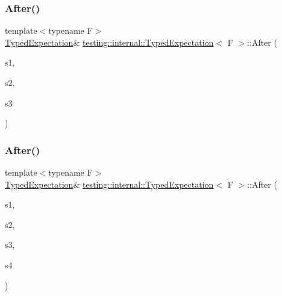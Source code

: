 \mbox{\label{classtesting_1_1internal_1_1_typed_expectation_a95a341dd221901b5e51dd7cfdbdb3570}} 
\subsubsection{\texorpdfstring{After()}{After()}\hspace{0.1cm}{\footnotesize\ttfamily [3/5]}}
{\footnotesize\ttfamily template$<$typename F$>$ \\
\hyperlink{classtesting_1_1internal_1_1_typed_expectation}{Typed\+Expectation}\& \hyperlink{classtesting_1_1internal_1_1_typed_expectation}{testing\+::internal\+::\+Typed\+Expectation}$<$ F $>$\+::After (\begin{DoxyParamCaption}\item[{const \hyperlink{classtesting_1_1_expectation_set}{Expectation\+Set} \&}]{s1,  }\item[{const \hyperlink{classtesting_1_1_expectation_set}{Expectation\+Set} \&}]{s2,  }\item[{const \hyperlink{classtesting_1_1_expectation_set}{Expectation\+Set} \&}]{s3 }\end{DoxyParamCaption})\hspace{0.3cm}{\ttfamily [inline]}}

\mbox{\label{classtesting_1_1internal_1_1_typed_expectation_a1749e368f659352ed8375512acafc178}} 
\subsubsection{\texorpdfstring{After()}{After()}\hspace{0.1cm}{\footnotesize\ttfamily [4/5]}}
{\footnotesize\ttfamily template$<$typename F$>$ \\
\hyperlink{classtesting_1_1internal_1_1_typed_expectation}{Typed\+Expectation}\& \hyperlink{classtesting_1_1internal_1_1_typed_expectation}{testing\+::internal\+::\+Typed\+Expectation}$<$ F $>$\+::After (\begin{DoxyParamCaption}\item[{const \hyperlink{classtesting_1_1_expectation_set}{Expectation\+Set} \&}]{s1,  }\item[{const \hyperlink{classtesting_1_1_expectation_set}{Expectation\+Set} \&}]{s2,  }\item[{const \hyperlink{classtesting_1_1_expectation_set}{Expectation\+Set} \&}]{s3,  }\item[{const \hyperlink{classtesting_1_1_expectation_set}{Expectation\+Set} \&}]{s4 }\end{DoxyParamCaption})\hspace{0.3cm}{\ttfamily [inline]}}

